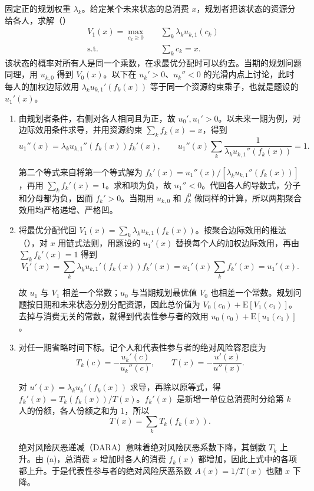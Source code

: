 \begin{solution}[label-content={证明},blank-type=manual,blank-vsep=9\baselineskip]
固定正的规划权重 $\lambda_k$。给定某个未来状态的总消费 $x$，规划者把该状态的资源分给各人，求解\ifdefined\WJHandoutKnowledge（）\fi
\[
\begin{aligned}
 V_1(x)=\max_{c_k\ge0}\quad &\sum_k\lambda_ku_{k,1}(c_k)\\
 \text{s.t.}\quad &\sum_kc_k=x.
\end{aligned}
\]
该状态的概率对所有人是同一个乘数，在求最优分配时可以约去。当期的规划问题同理，用 $u_{k,0}$ 得到 $V_0(x)$。以下在 $u_k'>0$、$u_k''<0$ 的光滑内点上讨论，此时每人的加权边际效用 $\lambda_ku_{k,1}'(f_k(x))$ 等于同一个资源约束乘子，也就是题设的 $u_1'(x)$。
\begin{enumerate}[label=(\alph*)]
 \item 由规划者条件，右侧对各人相同且为正，故 $u_0',u_1'>0$。以未来一期为例，对边际效用条件求导，并用资源约束 $\sum_k f_k(x)=x$，得到
 \[
 u_1''(x)=\lambda_ku_{k,1}''(f_k(x))f_k'(x),\qquad
 u_1''(x)\sum_k\frac{1}{\lambda_ku_{k,1}''(f_k(x))}=1.
 \]

 第二个等式来自将第一个等式解为 $f_k'(x)=u_1''(x)/[\lambda_ku_{k,1}''(f_k(x))]$，再用 $\sum_k f_k'(x)=1$。求和项为负，故 $u_1''<0$。代回各人的导数式，分子和分母都为负，因而 $f_k'>0$。当期用 $u_{k,0}$ 和 $f_k^0$ 做同样的计算，所以两期聚合效用均严格递增、严格凹。

 \item 将最优分配代回 $V_1(x)=\sum_k\lambda_ku_{k,1}(f_k(x))$。按聚合边际效用的推法\ifdefined\WJHandoutKnowledge（）\fi，对 $x$ 用链式法则，用题设的 $u_1'(x)$ 替换每个人的加权边际效用，再由 $\sum_k f_k'(x)=1$ 得到
 \[
 V_1'(x)=\sum_k\lambda_ku_{k,1}'(f_k(x))f_k'(x)
        =u_1'(x)\sum_k f_k'(x)=u_1'(x).
 \]

 故 $u_1$ 与 $V_1$ 相差一个常数；$u_0$ 与当期规划最优值 $V_0$ 也相差一个常数。规划问题按日期和未来状态分别分配资源，因此总价值为 $V_0(c_0)+\mathrm E[V_1(c_1)]$。去掉与消费无关的常数，就得到代表性参与者的效用 $u_0(c_0)+\mathrm E[u_1(c_1)]$。

 \item 对任一期省略时间下标。记个人和代表性参与者的绝对风险容忍度为
 \[
 T_k(c)=-\frac{u_k'(c)}{u_k''(c)},\qquad
 T(x)=-\frac{u'(x)}{u''(x)}.
 \]

 对 $u'(x)=\lambda_ku_k'(f_k(x))$ 求导，再除以原等式，得 $f_k'(x)=T_k(f_k(x))/T(x)$。$f_k'(x)$ 是新增一单位总消费时分给第 $k$ 人的份额，各人份额之和为 1，所以
 \[
 T(x)=\sum_kT_k(f_k(x)).
 \]

 绝对风险厌恶递减（DARA）意味着绝对风险厌恶系数下降，其倒数 $T_k$ 上升。由 (a)，总消费 $x$ 增加时各人的消费 $f_k(x)$ 都增加，因此上式中的各项都上升。于是代表性参与者的绝对风险厌恶系数 $A(x)=1/T(x)$ 也随 $x$ 下降。\qedhere
\end{enumerate}
\end{solution}

